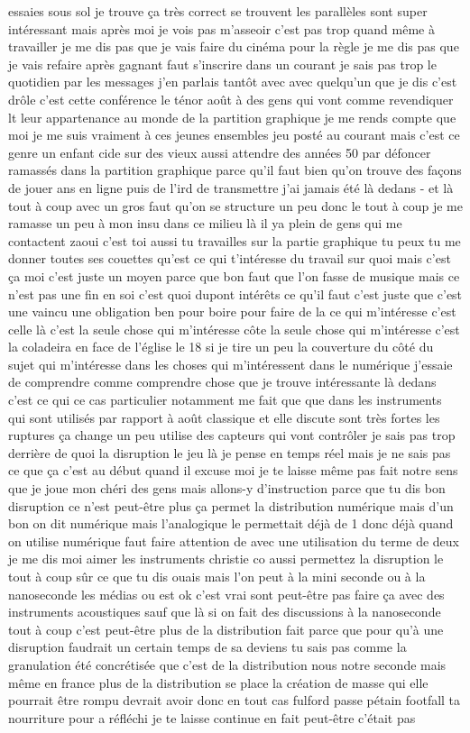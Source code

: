 essaies sous sol je trouve ça très correct se trouvent les parallèles sont super intéressant mais après moi je vois pas m'asseoir c'est pas trop quand même à travailler je me dis pas que je vais faire du cinéma pour la règle je me dis pas que je vais refaire après gagnant faut s'inscrire dans un courant je sais pas trop le quotidien par les messages j'en parlais tantôt avec avec quelqu'un que je dis c'est drôle c'est cette conférence le ténor août à des gens qui vont comme revendiquer lt leur appartenance au monde de la partition graphique je me rends compte que moi je me suis vraiment à ces jeunes ensembles jeu posté au courant mais c'est ce genre un enfant cide sur des vieux aussi attendre des années 50 par défoncer ramassés dans la partition graphique parce qu'il faut bien qu'on trouve des façons de jouer ans en ligne puis de l'ird de transmettre j'ai jamais été là dedans - et là tout à coup avec un gros faut qu'on se structure un peu donc le tout à coup je me ramasse un peu à mon insu dans ce milieu là il ya plein de gens qui me contactent zaoui c'est toi aussi tu travailles sur la partie graphique tu peux tu me donner toutes ses couettes qu'est ce qui t'intéresse du travail sur quoi mais c'est ça moi c'est juste un moyen parce que bon faut que l'on fasse de musique mais ce n'est pas une fin en soi c'est quoi dupont intérêts ce qu'il faut c'est juste que c'est une vaincu une obligation ben pour boire pour faire de la ce qui m'intéresse c'est celle là c'est la seule chose qui m'intéresse côte la seule chose qui m'intéresse c'est la coladeira en face de l'église le 18 si je tire un peu la couverture du côté du sujet qui m'intéresse dans les choses qui m'intéressent dans le numérique j'essaie de comprendre comme comprendre chose que je trouve intéressante là dedans c'est ce qui ce cas particulier notamment me fait que que dans les instruments qui sont utilisés par rapport à août classique et elle discute sont très fortes les ruptures ça change un peu utilise des capteurs qui vont contrôler je sais pas trop derrière de quoi la disruption le jeu là je pense en temps réel mais je ne sais pas ce que ça c'est au début quand il excuse moi je te laisse même pas fait notre sens que je joue mon chéri des gens mais allons-y d'instruction parce que tu dis bon disruption ce n'est peut-être plus ça permet la distribution numérique mais d'un bon on dit numérique mais l'analogique le permettait déjà de 1 donc déjà quand on utilise numérique faut faire attention de avec une utilisation du terme de deux je me dis moi aimer les instruments christie co aussi permettez la disruption le tout à coup sûr ce que tu dis ouais mais l'on peut à la mini seconde ou à la nanoseconde les médias ou est ok c'est vrai sont peut-être pas faire ça avec des instruments acoustiques sauf que là si on fait des discussions à la nanoseconde tout à coup c'est peut-être plus de la distribution fait parce que pour qu'à une disruption faudrait un certain temps de sa deviens tu sais pas comme la granulation été concrétisée que c'est de la distribution nous notre seconde mais même en france plus de la distribution se place la création de masse qui elle pourrait être rompu devrait avoir donc en tout cas fulford passe pétain footfall ta nourriture pour a réfléchi je te laisse continue en fait peut-être c'était pas 